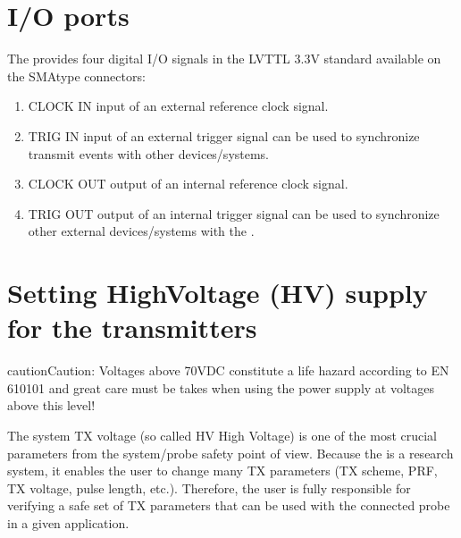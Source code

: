 \documentclass[letterpaper,10pt,english]{sphinxmanual}
\begin{document}
\section{I/O ports}
\label{\detokenize{content/hardware:i-o-ports}}
\sphinxAtStartPar
The  provides four digital I/O signals in the LVTTL 3.3V
standard available on the SMA\sphinxhyphen{}type connectors:
\begin{enumerate}
%
\item {} 
\sphinxAtStartPar
CLOCK IN \textendash{} input of an external reference clock signal.

\item {} 
\sphinxAtStartPar
TRIG IN \textendash{} input of an external trigger signal \textendash{} can be used to
synchronize transmit events with other devices/systems.

\item {} 
\sphinxAtStartPar
CLOCK OUT \textendash{} output of an internal reference clock signal.

\item {} 
\sphinxAtStartPar
TRIG OUT \textendash{} output of an internal trigger signal \textendash{} can be used to synchronize other external devices/systems with the .

\end{enumerate}

\sphinxAtStartPar
{}


\section{Setting High\sphinxhyphen{}Voltage (HV) supply for the transmitters}
\label{\detokenize{content/hardware:setting-high-voltage-hv-supply-for-the-transmitters}}
\begin{sphinxadmonition}{caution}{Caution:}
\sphinxAtStartPar
Voltages above 70VDC constitute a life hazard according to EN 61010\sphinxhyphen{}1 and great care must be takes when using the power supply at voltages above this level!
\end{sphinxadmonition}

\sphinxAtStartPar
The system TX voltage (so called HV \textendash{} High Voltage) is one of the most
crucial parameters from the system/probe safety point of view. Because
the  is a research system, it enables the user to change many
TX parameters (TX scheme, PRF, TX voltage, pulse length, etc.).
 Therefore,
the user is fully responsible for verifying a safe set of TX parameters
that can be used with the connected probe in a given application.
\end{document}
